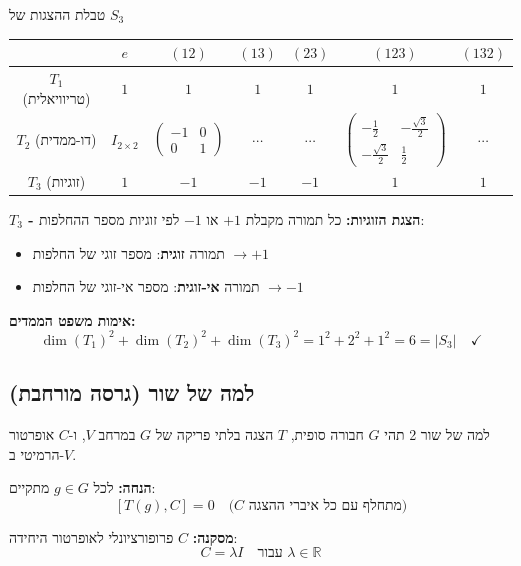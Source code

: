 \begin{summarybox}{טבלת ההצגות של $S_3$}
\begin{center}
\begin{tabular}{|c|c|c|c|c|c|c|}
\hline
& $e$ & $(12)$ & $(13)$ & $(23)$ & $(123)$ & $(132)$ \\ \hline
$T_1$ (טריוויאלית) & $1$ & $1$ & $1$ & $1$ & $1$ & $1$ \\ \hline
$T_2$ (דו-ממדית) & $I_{2\times 2}$ & $\begin{pmatrix} -1 & 0 \\ 0 & 1 \end{pmatrix}$ & $\cdots$ & $\cdots$ & $\begin{pmatrix} -\frac{1}{2} & -\frac{\sqrt{3}}{2} \\ -\frac{\sqrt{3}}{2} & \frac{1}{2} \end{pmatrix}$ & $\cdots$ \\ \hline
$T_3$ (זוגיות) & $1$ & $-1$ & $-1$ & $-1$ & $1$ & $1$ \\ \hline
\end{tabular}
\end{center}

\textbf{$T_3$ - הצגת הזוגיות:} כל תמורה מקבלת $+1$ או $-1$ לפי זוגיות מספר ההחלפות:
\begin{itemize}
    \item תמורה \textbf{זוגית}: מספר זוגי של החלפות $\to +1$
    \item תמורה \textbf{אי-זוגית}: מספר אי-זוגי של החלפות $\to -1$
\end{itemize}
\end{summarybox}

\textbf{אימות משפט הממדים:}
\[
\dim(T_1)^2 + \dim(T_2)^2 + \dim(T_3)^2 = 1^2 + 2^2 + 1^2 = 6 = |S_3| \quad \checkmark
\]

\subsection{למה של שור (גרסה מורחבת)}

\begin{theorembox}{למה של שור 2}
תהי $G$ חבורה סופית, $T$ הצגה בלתי פריקה של $G$ במרחב $V$, ו-$C$ אופרטור הרמיטי ב-$V$.

\textbf{הנחה:} לכל $g \in G$ מתקיים:
\[
[T(g), C] = 0 \quad \text{(}C\text{ מתחלף עם כל איברי ההצגה)}
\]

\textbf{מסקנה:} $C$ פרופורציונלי לאופרטור היחידה:
\[
\boxed{C = \lambda I \quad \text{עבור } \lambda \in \mathbb{R}}
\]
\end{theorembox}

